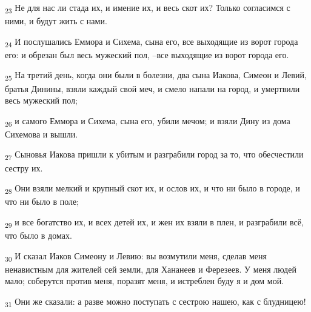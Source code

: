 \begin{tcolorbox}
\textsubscript{23} Не для нас ли стада их, и имение их, и весь скот их? Только согласимся с ними, и будут жить с нами.
\end{tcolorbox}
\begin{tcolorbox}
\textsubscript{24} И послушались Еммора и Сихема, сына его, все выходящие из ворот города его: и обрезан был весь мужеский пол, --все выходящие из ворот города его.
\end{tcolorbox}
\begin{tcolorbox}
\textsubscript{25} На третий день, когда они были в болезни, два сына Иакова, Симеон и Левий, братья Динины, взяли каждый свой меч, и смело напали на город, и умертвили весь мужеский пол;
\end{tcolorbox}
\begin{tcolorbox}
\textsubscript{26} и самого Еммора и Сихема, сына его, убили мечом; и взяли Дину из дома Сихемова и вышли.
\end{tcolorbox}
\begin{tcolorbox}
\textsubscript{27} Сыновья Иакова пришли к убитым и разграбили город за то, что обесчестили сестру их.
\end{tcolorbox}
\begin{tcolorbox}
\textsubscript{28} Они взяли мелкий и крупный скот их, и ослов их, и что ни было в городе, и что ни было в поле;
\end{tcolorbox}
\begin{tcolorbox}
\textsubscript{29} и все богатство их, и всех детей их, и жен их взяли в плен, и разграбили всё, что было в домах.
\end{tcolorbox}
\begin{tcolorbox}
\textsubscript{30} И сказал Иаков Симеону и Левию: вы возмутили меня, сделав меня ненавистным для жителей сей земли, для Хананеев и Ферезеев. У меня людей мало; соберутся против меня, поразят меня, и истреблен буду я и дом мой.
\end{tcolorbox}
\begin{tcolorbox}
\textsubscript{31} Они же сказали: а разве можно поступать с сестрою нашею, как с блудницею!
\end{tcolorbox}
